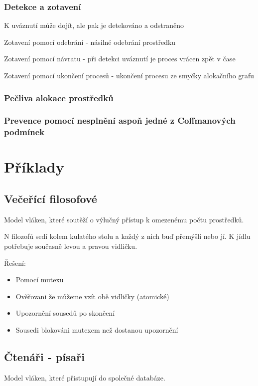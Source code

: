 \documentclass{szzclass}
\begin{document}
\subsubsection{Detekce a zotavení}
K uváznutí může dojít, ale pak je detekováno a odstraněno

Zotavení pomocí odebrání - násilné odebrání prostředku

Zotavení pomocí návratu - při detekci uváznutí je proces vrácen zpět v čase

Zotavení pomocí ukončení procesů - ukončení procesu ze smyčky alokačního grafu

\subsubsection{Pečliva alokace prostředků}

\subsubsection{Prevence pomocí nesplnění aspoň jedné z Coffmanových podmínek}

\section{Příklady}

\subsection{Večeřící filosofové}
Model vláken, které soutěží o výlučný přístup k omezenému počtu prostředků.

N filozofů sedí kolem kulatého stolu a každý z nich buď přemýšlí nebo jí. K jídlu potřebuje současně levou a pravou vidličku.

Řešení:
\begin{itemize}
    \item Pomocí mutexu
    \item Ověřovani že můžeme vzít obě vidličky (atomické)
    \item Upozornění sousedů po skončení
    \item Sousedi blokováni mutexem než dostanou upozornění
\end{itemize}



\subsection{Čtenáři - písaři}
Model vláken, které přistupují do společné databáze.
\end{document}
